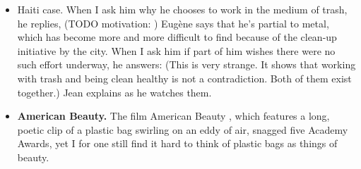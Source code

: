 \begin{itemize}
\item Haiti case. When I ask him why he chooses to work in the medium of trash, he replies,  (TODO motivation: ) Eugène says that he’s partial to metal, which has become more and more difficult to find because of the clean-up initiative by the city. When I ask him if part of him wishes there were no such effort underway, he answers:  (This is very strange. It shows that working with trash and being clean healthy is not a contradiction. Both of them exist together.)  Jean explains as he watches them.


\item \textbf{American Beauty.} The film American Beauty , which features a long, poetic clip of a plastic bag swirling on an eddy of air, snagged five Academy Awards, yet I for one still find it hard to think of plastic bags as things of beauty. 


\end{itemize}
